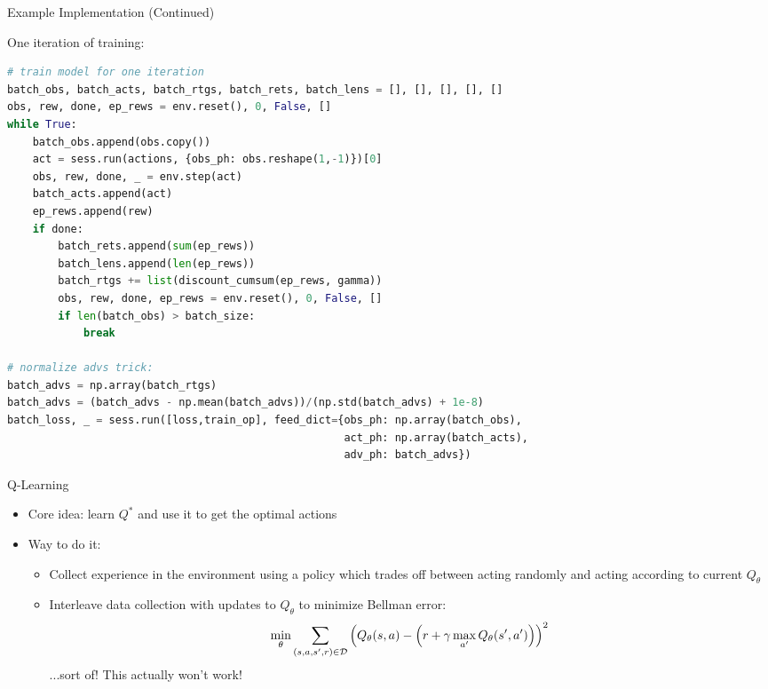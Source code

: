 \documentclass[9pt]{beamer}
\begin{document}
\begin{frame}[fragile]{Example Implementation (Continued)}

\lstset{style=mystyle}
One iteration of training:
\begin{lstlisting}[language=python]
# train model for one iteration
batch_obs, batch_acts, batch_rtgs, batch_rets, batch_lens = [], [], [], [], []
obs, rew, done, ep_rews = env.reset(), 0, False, []
while True:
    batch_obs.append(obs.copy())
    act = sess.run(actions, {obs_ph: obs.reshape(1,-1)})[0]
    obs, rew, done, _ = env.step(act)
    batch_acts.append(act)
    ep_rews.append(rew)
    if done:
        batch_rets.append(sum(ep_rews))
        batch_lens.append(len(ep_rews))
        batch_rtgs += list(discount_cumsum(ep_rews, gamma))
        obs, rew, done, ep_rews = env.reset(), 0, False, []
        if len(batch_obs) > batch_size:
            break

# normalize advs trick:
batch_advs = np.array(batch_rtgs)
batch_advs = (batch_advs - np.mean(batch_advs))/(np.std(batch_advs) + 1e-8)
batch_loss, _ = sess.run([loss,train_op], feed_dict={obs_ph: np.array(batch_obs),
                                                     act_ph: np.array(batch_acts),
                                                     adv_ph: batch_advs})
\end{lstlisting}


\lstset{style=mystyle3}

\end{frame}

\begin{frame}{Q-Learning}

\begin{itemize}
\item Core idea: learn $Q^*$ and use it to get the optimal actions
\item Way to do it:
\begin{itemize}
\item Collect experience in the environment using a policy which trades off between acting randomly and acting according to current $Q_{\theta}$
\item Interleave data collection with updates to $Q_{\theta}$ to minimize Bellman error:
%
\begin{equation*}
\min_{\theta} \sum_{(s,a,s',r)\in {\mathcal D}} \left(Q_{\theta}(s,a) - \left(r + \gamma \max_{a'} Q_{\theta}(s',a') \right) \right)^2
\end{equation*}
...sort of! This actually won't work!
\end{itemize}

\end{itemize}

\end{frame}
\end{document}
